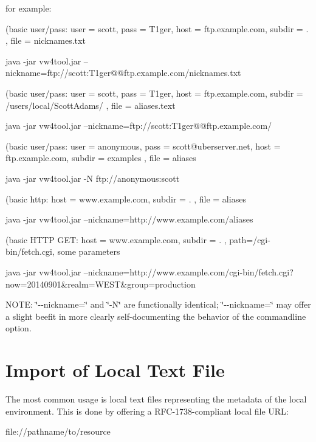 for example\+:

(basic user/pass\+: user = scott, pass = T1ger, host = ftp.\+example.\+com, subdir = . , file = nicknames.\+txt \begin{DoxyVerb}java -jar vw4tool.jar --nickname=ftp://scott:T1ger@@ftp.example.com/nicknames.txt
\end{DoxyVerb}


(basic user/pass\+: user = scott, pass = T1ger, host = ftp.\+example.\+com, subdir = /users/local/\+Scott\+Adams/ , file = aliases.\+text \begin{DoxyVerb}java -jar vw4tool.jar --nickname=ftp://scott:T1ger@@ftp.example.com/%
\end{DoxyVerb}


(basic user/pass\+: user = anonymous, pass = scott@uberserver.\+net, host = ftp.\+example.\+com, subdir = examples , file = aliases \begin{DoxyVerb}java -jar vw4tool.jar -N ftp://anonymous:scott%
\end{DoxyVerb}


(basic http\+: host = www.\+example.\+com, subdir = . , file = aliases \begin{DoxyVerb}java -jar vw4tool.jar --nickname=http://www.example.com/aliases
\end{DoxyVerb}


(basic H\+T\+T\+P G\+E\+T\+: host = www.\+example.\+com, subdir = . , path=/cgi-\/bin/fetch.cgi, some parameters \begin{DoxyVerb}java -jar vw4tool.jar --nickname=http://www.example.com/cgi-bin/fetch.cgi?now=20140901&realm=WEST&group=production
\end{DoxyVerb}


N\+O\+T\+E\+: \char`\"{}-\/-\/nickname=\char`\"{} and \char`\"{}-\/\+N\char`\"{} are functionally identical; \char`\"{}-\/-\/nickname=\char`\"{} may offer a slight beefit in more clearly self-\/documenting the behavior of the commandline option.

\section*{Import of Local Text File }

The most common usage is local text files representing the metadata of the local environment. This is done by offering a R\+F\+C-\/1738-\/compliant local file U\+R\+L\+: \begin{DoxyVerb}file://pathname/to/resource
\end{DoxyVerb}


